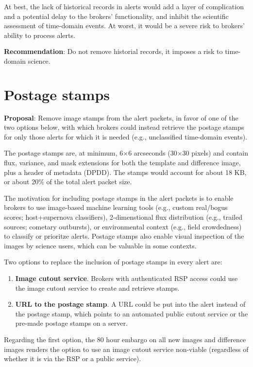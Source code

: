 \documentclass[DM,authoryear,toc]{lsstdoc}
\begin{document}
At best, the lack of historical records in alerts would add a layer of complication and a potential delay to the brokers' 
functionality, and inhibit the scientific assessment of time-domain events.
At worst, it would be a severe risk to brokers' ability to process alerts.

\textbf{Recommendation}: Do not remove historial records, it imposes a risk to time-domain science.


\section{Postage stamps}\label{sec:stamps}

\textbf{Proposal}: Remove image stamps from the alert packets, in favor of one of the two options below, 
with which brokers could instead retrieve the postage stamps for only those alerts for which it is needed 
(e.g., unclassified time-domain events).

The postage stamps are, at minimum, 6$\times$6 arcseconds (30$\times$30 pixels) and contain flux, variance, 
and mask extensions for both the template and difference image, plus a header of metadata (DPDD).
The stamps would account for about 18 KB, or about 20\% of the total alert packet size.

The motivation for including postage stamps in the alert packets is to enable brokers to use image-based 
machine learning tools (e.g., custom real/bogus scores; host+supernova classifiers), 2-dimenstional flux distribution 
(e.g., trailed sources; cometary outbursts), or environmental context (e.g., field crowdedness) to classify or prioritze alerts.
Postage stamps also enable visual inspection of the images by science users, which can be valuable in some contexts.

Two options to replace the inclusion of postage stamps in every alert are:
\begin{enumerate}
\item \textbf{Image cutout service}. Brokers with authenticated RSP access could use the image cutout service to 
create and retrieve stamps.
\item \textbf{URL to the postage stamp}. A URL could be put into the alert instead of the postage stamp, which 
points to an automated public cutout service or the pre-made postage stamps on a server.
\end{enumerate}

Regarding the first option, the 80 hour embargo on all new images and difference images renders the option to use 
an image cutout service non-viable (regardless of whether it is via the RSP or a public service).
\end{document}

